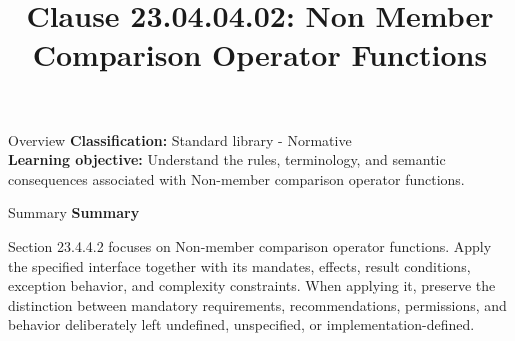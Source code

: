 \documentclass[10pt,letterpaper]{article}
\title{Clause 23.04.04.02: Non Member Comparison Operator Functions}
\author{}
\date{}
\begin{document}
\maketitle
\begin{CornellOverviewBox}{Overview}
\textbf{Classification:} Standard library - Normative\\[2pt]
\textbf{Learning objective:} Understand the rules, terminology, and semantic consequences associated with Non-member comparison operator functions.
\end{CornellOverviewBox}\begin{CornellSummaryBox}{Summary}
{\sffamily\bfseries\color{Accent} Summary}\par\vspace{3pt}Section 23.4.4.2 focuses on Non-member comparison operator functions. Apply the specified interface together with its mandates, effects, result conditions, exception behavior, and complexity constraints. When applying it, preserve the distinction between mandatory requirements, recommendations, permissions, and behavior deliberately left undefined, unspecified, or implementation-defined.
\end{CornellSummaryBox}
\end{document}

